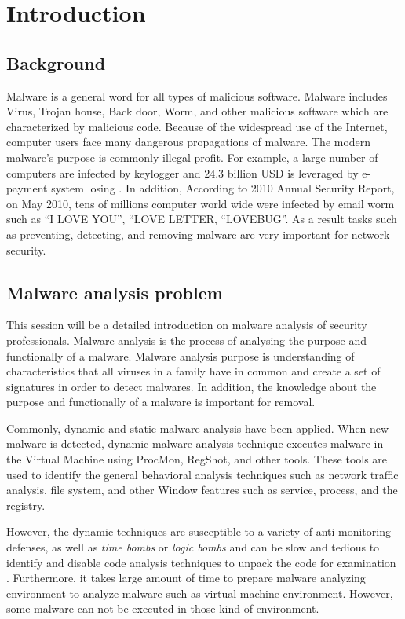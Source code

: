\chapter{Introduction}\label{chap:1}

%
%
\section{Background}
Malware is a general word for all types of malicious software. Malware includes Virus, Trojan house, Back door, Worm, and other malicious software which are characterized by malicious code.
Because of the widespread use of the Internet, computer users face many dangerous propagations of malware. The modern malware's purpose is commonly illegal profit. For example, a large number of computers are infected by keylogger and $24.3$ billion USD is leveraged  by e-payment system losing \cite{keylogger}. In addition, According to 2010 Annual Security Report, on May 2010, tens of millions computer world wide were infected by email worm such as “I LOVE YOU”, “LOVE LETTER, “LOVEBUG”\cite{Symantec}. As a result tasks such as preventing, detecting, and removing malware are very important for network security.
	
\section{Malware analysis problem}	
This session will be a detailed introduction on malware analysis of security professionals. Malware analysis is the process of analysing the purpose and functionally of a malware. Malware analysis purpose is understanding of characteristics that all viruses in a family have in common and create a set of signatures in order to detect malwares. In addition, the knowledge about the purpose and functionally of a malware is important for removal.

Commonly, dynamic and static malware analysis have been applied. When new malware is detected, dynamic malware analysis technique executes malware in the Virtual Machine using ProcMon, RegShot, and other tools. These tools are used to identify the general behavioral analysis techniques such as network traffic analysis, file system, and other Window features such as service, process, and the registry. 

However, the dynamic techniques are susceptible to a variety of anti-monitoring defenses, as well as \emph{time bombs} or \emph{logic bombs} and can be slow and tedious to identify and disable code analysis techniques to unpack the code for examination \cite{georg}. Furthermore, it takes large amount of time to prepare malware analyzing environment to analyze malware such as virtual machine environment. However, some malware can not be executed in those kind of environment.

